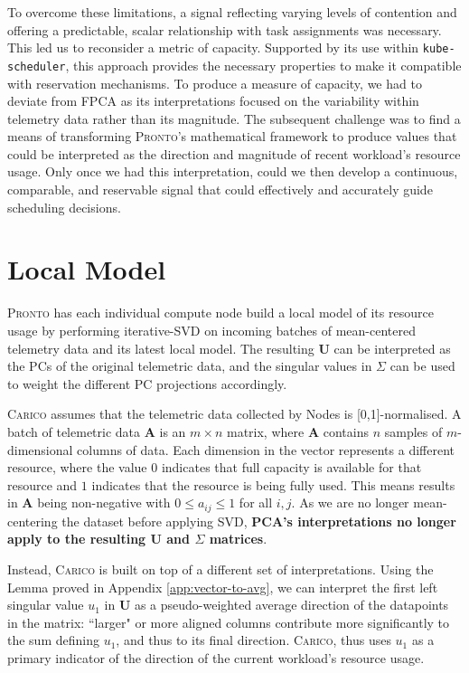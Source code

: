 To overcome these limitations, a signal reflecting varying levels of contention
and offering a predictable, scalar relationship with task assignments was
necessary. This led us to reconsider a metric of capacity. Supported by its use
within \texttt{kube-scheduler}, this approach provides the necessary properties
to make it compatible with reservation mechanisms. To produce a measure of
capacity, we had to deviate from FPCA as its interpretations focused on the
variability within telemetry data rather than its magnitude. The subsequent
challenge was to find a means of transforming \textsc{Pronto}'s mathematical
framework to produce values that could be interpreted as the direction and
magnitude of recent workload's resource usage. Only once we had this
interpretation, could we then develop a continuous, comparable, and reservable
signal that could effectively and accurately guide scheduling decisions.

\section{Local Model}
\label{sec:local-model-construction}
\textsc{Pronto} has each individual compute node build a local model of its
resource usage by performing iterative-SVD on incoming batches of
mean-centered telemetry data and its latest local model. The resulting
$\mathbf{U}$ can be interpreted as the PCs of the original telemetric data, and
the singular values in $\Sigma$ can be used to weight the different PC
projections accordingly.

\textsc{Carico} assumes that the telemetric data collected by Nodes is
[0,1]-normalised. A batch of telemetric data $\mathbf{A}$ is an $m \times n$
matrix, where $\mathbf{A}$ contains $n$ samples of $m$-dimensional columns of
data. Each dimension in the vector represents a different resource, where the
value $0$ indicates that full capacity is available for that resource and $1$
indicates that the resource is being fully used. This means results in
$\mathbf{A}$ being non-negative with $0 \leq a_{ij} \leq 1$ for all $i,j$. As we
are no longer mean-centering the dataset before applying SVD, \textbf{PCA's
interpretations no longer apply to the resulting $\mathbf{U}$ and $\Sigma$
matrices}.

Instead, \textsc{Carico} is built on top of  a different set of interpretations.
Using the Lemma proved in Appendix \ref{app:vector-to-avg}, we can interpret the
first left singular value $u_1$ in $\mathbf{U}$ as a pseudo-weighted average
direction of the datapoints in the matrix: ``larger" or more aligned columns
contribute more significantly to the sum defining $u_1$, and thus to its final
direction. \textsc{Carico}, thus uses $u_1$ as a primary indicator of the
direction of the current workload's resource usage.

